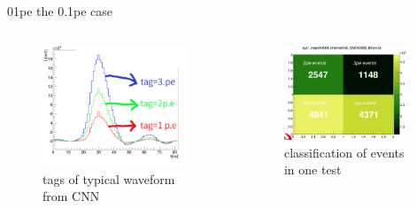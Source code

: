 \documentclass[11pt,compress,xcolor=x11names,UTF8]{beamer}
\begin{document}
\begin{frame}{01pe}
	the 0.1pe case
\begin{columns}
\begin{column}{.485\textwidth}
\begin{figure}
\centering
\includegraphics[width=0.94\textwidth]{figure/cnntags.png} %
\caption{tags of typical waveform from CNN}
\end{figure}
\end{column}
\begin{column}{.485\textwidth}
\begin{figure}
\centering
\includegraphics[width=0.94\textwidth]{figure/cnnres.png} %
\caption{classification of events in one test}
\end{figure}
\end{column}
\end{columns}
\end{frame}
\end{document}
